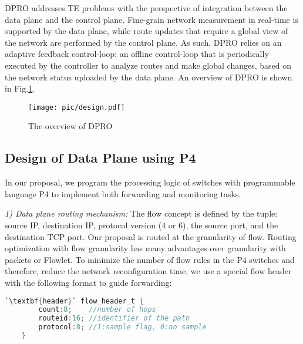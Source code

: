 \documentclass[10pt,conference]{IEEEtran}
\begin{document}
DPRO addresses TE problems with the perspective of integration between the data plane and the control plane. Fine-grain network measurement in real-time is supported by the data plane, while route updates that require a global view of the network are performed by the control plane. As such, DPRO relies on an adaptive feedback control-loop: an offline control-loop that is periodically executed by the controller to analyze routes and make global changes, based on the network status uploaded by the data plane. An overview of DPRO is shown in Fig.\ref{design}.
\begin{figure}[t]
\centerline{\texttt{[image: pic/design.pdf]}}
\caption{The overview of DPRO}
\label{design}
\end{figure}
\subsection{Design of Data Plane using P4}
In our proposal, we program the processing logic of switches with programmable language P4\cite{p42014} to implement both forwarding and monitoring tasks.

\emph{1) Data plane routing mechanism:} The flow concept is defined by the tuple: source IP, destination IP, protocol version (4 or 6), the source port, and the destination TCP port. Our proposal is routed at the granularity of flow. Routing optimization with flow granularity has many advantages over granularity with packets or Flowlet\cite{Kandula2007Flare}. To minimize the number of flow rules in the P4 switches and therefore, reduce the network reconfiguration time, we use a special flow header with the following format to guide forwarding:

\begin{lstlisting}[breaklines,columns=flexible,basicstyle=\footnotesize,language={C},tabsize=4,keywordstyle=\bfseries,stringstyle=\ttfamily,escapeinside=``,commentstyle=\color{red!50!green!50!blue!50},showstringspaces=false]
	`\textbf{header}` flow_header_t {
		count:8;	//number of hops
		routeid:16;	//identifier of the path
		protocol:8;	//1:sample flag, 0:no sample
	}
\end{lstlisting}
\end{document}
